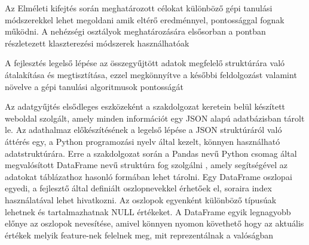 \label{Chap:dokumen}

Az Elméleti kifejtés során meghatározott célokat különböző gépi tanulási módszerekkel lehet megoldani amik eltérő eredménnyel, pontossággal fognak működni. A nehézségi osztályok meghatározására elsősorban a   pontban részletezett klaszterezési módszerek használhatóak

A fejlesztés legelső lépése az összegyűjtött adatok megfelelő struktúrára való átalakítása és megtisztítása, ezzel megkönnyítve a későbbi feldolgozást valamint növelve a gépi tanulási algoritmusok pontosságát

Az adatgyűjtés elsődleges eszközeként a szakdolgozat keretein belül készített weboldal szolgált, amely minden információt egy JSON alapú adatbázisban tárolt le. Az adathalmaz előkészítésének a legelső lépése a JSON struktúráról való áttérés egy, a Python programozási nyelv által kezelt, könnyen használható adatstruktúrára. Erre a szakdolgozat során a Pandas \cite{python-pandas} nevű Python csomag által megvalósított DataFrame nevű struktúra fog szolgálni , amely segítségével az adatokat táblázathoz hasonló formában lehet tárolni. Egy DataFrame oszlopai egyedi, a fejlesztő által definiált oszlopnevekkel érhetőek el, soraira index használatával lehet hivatkozni. Az oszlopok egyenként különböző típusúak lehetnek és tartalmazhatnak NULL értékeket. A DataFrame egyik legnagyobb előnye az oszlopok nevesítése, amivel könnyen nyomon követhető hogy az aktuális értékek melyik feature-nek felelnek meg, mit reprezentálnak a valóságban

